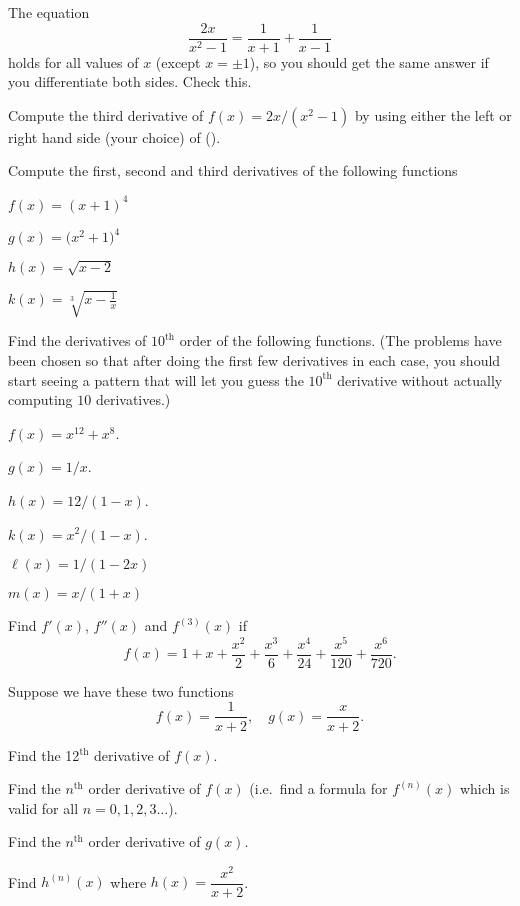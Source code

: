\begin{multicols}{2}\setlength{\parindent}{0pt}
\problem  The equation
\begin{equation}
  \frac{2x}{x^2-1}= \frac{1}{x+1}+\frac{1}{x-1}  \tag{\dag}
\end{equation}
holds for all values of $x$ (except $x=\pm1$), so you should get
the same answer if you differentiate both sides.  Check this.

Compute the third derivative of $f(x) = 2x/(x^2-1)$ by using either the
left or right hand side (your choice) of (\dag).

\problem Compute the first, second and third derivatives of the following
functions

\subprob $f(x) = (x+1)^4$

\subprob $g(x) = \bigl(x^2+1\bigr)^4$

\subprob $h(x) = \sqrt{x-2} $

\subprob $k(x) = \sqrt[3]{x-\frac1x}$




\problem Find the derivatives of $10^\text{th}$ order of the following
functions. (The problems have been chosen so that after doing the
first few derivatives in each case, you should start seeing a pattern
that will let you guess the $10^{\text{th}}$ derivative without
actually computing $10$ derivatives.)

\subprob $  f(x) = x^{12}+x^8 $.

\subprob $  g(x) = 1/x $.

\subprob $  h(x) = 12/(1-x)$.

\subprob $  k(x) = x^2/(1-x)$.

\subprob $  \ell(x) = 1/(1-2x)$

\subprob $  m(x) = x/(1+x)$


\problem 
Find $f'(x)$, $f''(x)$ and $f^{(3)}(x)$ if
\[
f(x)=1+x+\frac{x^2}{2}+\frac{x^3}{6}+\frac{x^4}{24}
+\frac{x^5}{120}+\frac{x^6}{720}.
\]


\problem \groupproblem  Suppose we have these two functions
\[
f(x)=\frac{1} {x+2},\quad
g(x)=\frac{x} {x+2}.
\]

\subprob  Find the 12$^{\text{th}}$ derivative of $f(x)$.

\subprob  Find the $n^{\text{th}}$ order derivative of
$f(x)$  (i.e.\ find a formula for $f^{(n)}(x)$
which is valid for all $n=0, 1, 2, 3\ldots$).

\subprob  Find the $n^{\text{th}}$ order derivative of
$g(x)$.

\subprob Find $h^{(n)}(x)$ where $h(x) = \dfrac{x^2} {x+2}$.





\end{multicols}
